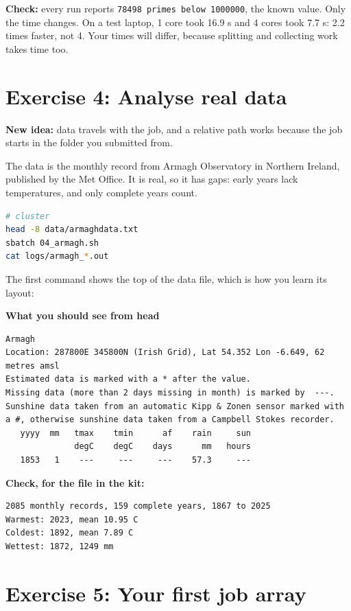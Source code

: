 \textbf{Check:} every run reports \texttt{78498\ primes\ below\ 1000000}, the known value. Only the time changes. On a test laptop, 1 core took 16.9 s and 4 cores took 7.7 s: 2.2 times faster, not 4. Your times will differ, because splitting and collecting work takes time too.

\section{Exercise 4: Analyse real data}\label{exercise-4-analyse-real-data}

\textbf{New idea:} data travels with the job, and a relative path works because the job starts in the folder you submitted from.

The data is the monthly record from Armagh Observatory in Northern Ireland, published by the Met Office. It is real, so it has gaps: early years lack temperatures, and only complete years count.

\begin{lstlisting}[language=bash]
# cluster
head -8 data/armaghdata.txt
sbatch 04_armagh.sh
cat logs/armagh_*.out
\end{lstlisting}

The first command shows the top of the data file, which is how you learn its layout:

\textbf{What you should see from head}

\begin{lstlisting}[language=text]
Armagh
Location: 287800E 345800N (Irish Grid), Lat 54.352 Lon -6.649, 62 metres amsl
Estimated data is marked with a * after the value.
Missing data (more than 2 days missing in month) is marked by  ---.
Sunshine data taken from an automatic Kipp & Zonen sensor marked with a #, otherwise sunshine data taken from a Campbell Stokes recorder.
   yyyy  mm   tmax    tmin      af    rain     sun
              degC    degC    days      mm   hours
   1853   1    ---     ---     ---    57.3     ---
\end{lstlisting}

\textbf{Check, for the file in the kit:}

\begin{lstlisting}[language=text]
2085 monthly records, 159 complete years, 1867 to 2025
Warmest: 2023, mean 10.95 C
Coldest: 1892, mean 7.89 C
Wettest: 1872, 1249 mm
\end{lstlisting}

\section{Exercise 5: Your first job array}\label{exercise-5-your-first-job-array}

